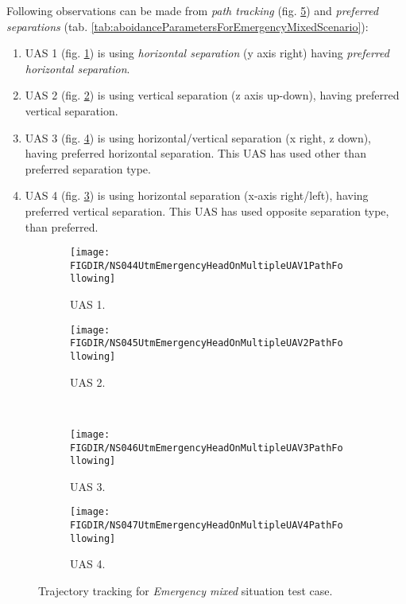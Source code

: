     Following observations can be made from \emph{path tracking} (fig. \ref{fig:testCaseEmergencyMixedTrajectoryTracking}) and \emph{preferred separations} (tab. \ref{tab:aboidanceParametersForEmergencyMixedScenario}):
    
    \begin{enumerate}
        \item UAS 1 (fig. \ref{fig:emergencyMixedPathTrackingUAS1}) is using \emph{horizontal separation} (y axis right) having \emph{preferred horizontal separation}.
        
        \item UAS 2 (fig. \ref{fig:emergencyMixedPathTrackingUAS2}) is using vertical separation (z axis up-down), having preferred vertical separation.
        
        \item UAS 3 (fig. \ref{fig:emergencyMixedPathTrackingUAS3}) is using horizontal/vertical separation (x right, z down), having preferred horizontal separation.  This UAS has used other than preferred separation type.
        
        \item UAS 4 (fig. \ref{fig:emergencyMixedPathTrackingUAS4}) is using horizontal separation (x-axis right/left), having preferred vertical separation. This UAS has used opposite separation type, than preferred.
    \end{enumerate}
    
    
    \begin{figure}[H]
        \centering
        \begin{subfigure}{0.48\textwidth}
        	\centering
            \texttt{[image: \\FIGDIR/NS044UtmEmergencyHeadOnMultipleUAV1PathFollowing]}
            \caption{UAS 1.}
            \label{fig:emergencyMixedPathTrackingUAS1}
        \end{subfigure}
        \begin{subfigure}{0.48\textwidth}
        	\centering
            \texttt{[image: \\FIGDIR/NS045UtmEmergencyHeadOnMultipleUAV2PathFollowing]} 
            \caption{UAS 2.}
            \label{fig:emergencyMixedPathTrackingUAS2}
        \end{subfigure}
        \\
        \begin{subfigure}{0.48\textwidth}
        	\centering
            \texttt{[image: \\FIGDIR/NS046UtmEmergencyHeadOnMultipleUAV3PathFollowing]} 
            \caption{UAS 3.}
            \label{fig:emergencyMixedPathTrackingUAS4}
        \end{subfigure}
        \begin{subfigure}{0.48\textwidth}
        	\centering
            \texttt{[image: \\FIGDIR/NS047UtmEmergencyHeadOnMultipleUAV4PathFollowing]} 
            \caption{UAS 4.}
            \label{fig:emergencyMixedPathTrackingUAS3}
        \end{subfigure}
        \caption{Trajectory tracking for \emph{Emergency mixed} situation test case.}
        \label{fig:testCaseEmergencyMixedTrajectoryTracking}
    \end{figure}
    
